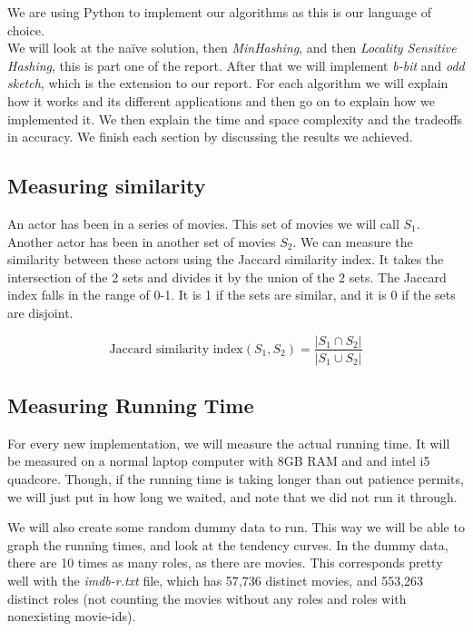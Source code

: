 \documentclass[a4paper,11pt]{article}
\begin{document}
We are using Python to implement our algorithms as this is our language of choice. \\

We will look at the naïve solution, then \emph{MinHashing}, and then \emph{Locality Sensitive Hashing}, this is part one of the report. After that we will implement \emph{b-bit} and \emph{odd sketch}, which is the extension to our report. For each algorithm we will explain how it works and its different applications and then go on to explain how we implemented it. We then explain the time and space complexity and the tradeoffs in accuracy. We finish each section by discussing the results we achieved.\\


\subsection{Measuring similarity}
An actor has been in a series of movies. This set of movies we will call $S_1$. Another actor has been in another set of movies $S_2$. We can measure the similarity between these actors using the Jaccard similarity index. It takes the intersection of the 2 sets and divides it by the union of the 2 sets. The Jaccard index falls in the range of 0-1. It is 1 if the sets are similar, and it is 0 if the sets are disjoint.

\begin{equation}
\text{Jaccard similarity index} (S_1, S_2) = \frac{|S_1 \cap S_2|}{|S_1 \cup S_2|}
\end{equation}



\subsection{Measuring Running Time}
For every new implementation, we will measure the actual running time. It will be measured on a normal laptop computer with 8GB RAM and and intel i5 quadcore. Though, if the running time is taking longer than out patience permits, we will just put in how long we waited, and note that we did not run it through.

We will also create some random dummy data to run. This way we will be able to graph the running times, and look at the tendency curves. In the dummy data, there are 10 times as many roles, as there are movies. This corresponds pretty well with the \emph{imdb-r.txt} file, which has 57,736 distinct movies, and 553,263 distinct roles (not counting the movies without any roles and roles with nonexisting movie-ids).
\end{document}
